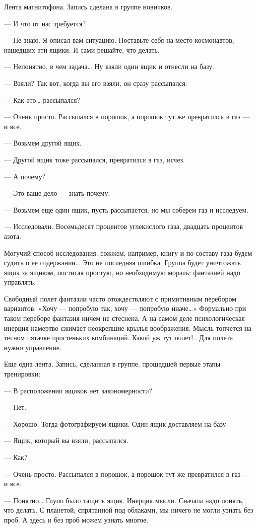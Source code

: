 Лента магнитофона. Запись сделана в группе новичков.

— И что от нас требуется?

— Не знаю.  Я описал вам  ситуацию. Поставьте себя  на место  космонавтов,
нашедших эти ящики. И сами решайте, что делать.

— Непонятно, в чем задача… Ну взяли один ящик и отнесли на базу.

— Взяли? Так вот, когда вы его взяли, он сразу рассыпался.

— Как это… рассыпался?

— Очень просто. Рассыпался в порошок, а порошок тут же превратился в газ —
и все.

— Возьмем другой ящик.

— Другой ящик тоже рассыпался, превратился в газ, исчез.

— А почему?

— Это ваше дело — знать почему.

— Возьмем еще один ящик, пусть рассыпается, но мы соберем газ и исследуем.

— Исследовали. Восемьдесят процентов углекислого газа, двадцать  процентов
азота.

Могучий способ исследования:  сожжем, например,  книгу и  по составу  газа
будем судить  о  ее содержании…  Это  не последняя  ошибка.  Группа  будет
уничтожать ящик  за  ящиком,  постигая  простую,  но  необходимую  мораль:
фантазией надо управлять.

Свободный полет  фантазии  часто  отождествляют  с  примитивным  перебором
вариантов: «Хочу —  попробую так,  хочу — попробую  иначе…» Формально  при
таком переборе фантазия ничем не стеснена. А на самом деле психологическая
инерция намертво сжимает неокрепшие крылья воображения. Мысль топчется  на
тесном пятачке простеньких  комбинаций. Какой уж  тут полет!.. Для  полета
нужно управление.

Еще одна  лента.  Запись,  сделанная  в  группе,  прошедшей  первые  этапы
тренировки:

— В расположении ящиков нет закономерности?

— Нет.

— Хорошо. Тогда фотографируем ящики. Один ящик доставляем на базу.

— Ящик, который вы взяли, рассыпался.

— Как?

— Очень просто. Рассыпался в порошок, а порошок тут же превратился в газ —
и все.

— Понятно… Глупо было тащить ящик. Инерция мысли. Сначала надо понять, что
делать. С планетой, спрятанной под облаками, мы ничего не могли узнать без
проб. А здесь и без проб можем узнать многое.

